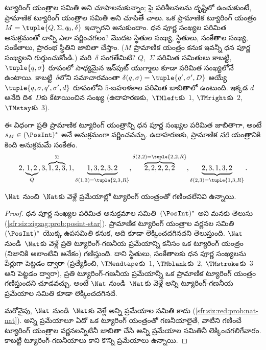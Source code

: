 \documentclass[../../../include/open-logic-section]{subfiles}
\begin{document}
\begin{explain}
ట్యూరింగ్ యంత్రాల సమితి  అని చూపాలనుకున్నాం; పై పరిశీలనలను
దృష్టిలో ఉంచుకుంటే, ప్రామాణిక ట్యూరింగ్ యంత్రాల సమితి  అని
చూపితే చాలు. ఒక ప్రామాణిక ట్యూరింగ్ యంత్రం
$M = \tuple{Q, \Sigma, q_0, \delta}$ ఇచ్చారని అనుకుందాం. ధన పూర్ణ సంఖ్యల
పరిమిత అనుక్రమంతో దాన్ని ఎలా వర్ణించగలం? మొదట స్థితుల సంఖ్య, స్థితులు,
సంకేతాల సంఖ్య, సంకేతాలు, ప్రారంభ స్థితిని జాబితా చేస్తాం. ($M$ ప్రామాణిక
యంత్రం కనుక ఇవన్నీ ధన పూర్ణ సంఖ్యలని గుర్తుంచుకోండి.) మరి~$\delta$ సంగతేమిటి?
$Q$,~$\Sigma$ పరిమిత సమితులు కాబట్టి, $\tuple{q,\sigma}$ రూపంలో
సాధ్యమైన ఇన్‌పుట్ యుగ్మాలు కూడా పరిమిత సంఖ్యలోనే ఉంటాయి. కాబట్టి~$\delta$లోని
సమాచారమంతా $\delta(q,\sigma) = \tuple{q', \sigma', D}$ అయ్యే
$\tuple{q, \sigma, q', \sigma', d}$ రూపంలోని $5$-బహుళకాల పరిమిత జాబితాలో
ఉంటుంది. ఇక్కడ $d$ అనేది దిశ~$D$కు కేటాయించిన సంఖ్య (ఉదాహరణకు,~$\TMleft$కు~$1$,
$\TMright$కు~$2$, $\TMstay$కు~$3$).

ఈ విధంగా ప్రతి ప్రామాణిక ట్యూరింగ్ యంత్రాన్ని ధన పూర్ణ సంఖ్యల పరిమిత
జాబితాగా, అంటే $s_M \in (\PosInt)^*$ అనే అనుక్రమంగా వర్ణించవచ్చు. ఉదాహరణకు,
ప్రామాణిక \emph{సరి} యంత్రానికి కింది అనుక్రమమే సంకేతం.
\[
2, \underbrace{1, 2}_Q, 3, \overbrace{1, 2, 3}^\Sigma, 1, \underbrace{1, 3, 2, 3, 2}_{\delta(1,3) = \tuple{2,3,R}},
\overbrace{2, 2, 2, 2, 2}^{\delta(2,2) = \tuple{2,2,R}},
\underbrace{2, 3, 1, 3, 2}_{\delta(2,3) = \tuple{1,3,R}}.
\]
\end{explain}

\begin{thm}
$\Nat$ నుంచి~$\Nat$కు వెళ్లే ప్రమేయాల్లో ట్యూరింగ్ యంత్రంతో గణించలేనివి ఉన్నాయి.
\end{thm}

\begin{proof}
ధన పూర్ణ సంఖ్యల పరిమిత అనుక్రమాల సమితి~$(\PosInt)^*$  అని
మనకు తెలుసు (\cref{sfr:siz:zigzag:prob:posint-star}). ప్రామాణిక ట్యూరింగ్
యంత్రాల వర్ణనల సమితి~$(\PosInt)^*$ యొక్క ఉపసమితి కనుక, అది కూడా లెక్కించదగినదని
తెలుస్తుంది. $\Nat$ నుండి~$\Nat$కు వెళ్లే ప్రతి ట్యూరింగ్-గణనీయ ప్రమేయాన్ని
కనీసం ఒక ట్యూరింగ్ యంత్రం (నిజానికి అలాంటివి అనేకం) గణిస్తుంది. దాని స్థితులు,
సంకేతాలకు ధన పూర్ణ సంఖ్యలను పేర్లుగా పెట్టడం ద్వారా (ప్రత్యేకించి,
$\TMendtape$కు~$1$, $\TMblank$కు~$2$, $\TMstroke$కు~$3$ అని పెట్టడం ద్వారా),
ప్రతి ట్యూరింగ్-గణనీయ ప్రమేయాన్నీ ఒక ప్రామాణిక ట్యూరింగ్ యంత్రం గణిస్తుందని
చూడవచ్చు. అంటే $\Nat$ నుండి~$\Nat$కు వెళ్లే అన్ని ట్యూరింగ్-గణనీయ ప్రమేయాల
సమితి కూడా లెక్కించదగినదే.

మరోవైపు, $\Nat$ నుండి~$\Nat$కు వెళ్లే అన్ని ప్రమేయాల సమితి 
కాదు (\cref{sfr:siz:red:prob:nat-nat}). అన్ని ప్రమేయాలూ ఏదో ఒక ట్యూరింగ్
యంత్రంతో గణనీయాలైతే, వాటిని గణించే ట్యూరింగ్ యంత్రాల వర్ణనలన్నిటినీ జాబితా
చేసి అన్ని ప్రమేయాల సమితినీ లెక్కించగలిగేవారం. కాబట్టి ట్యూరింగ్-గణనీయాలు
కాని కొన్ని ప్రమేయాలు ఉన్నాయి.
\end{proof}
\end{document}
